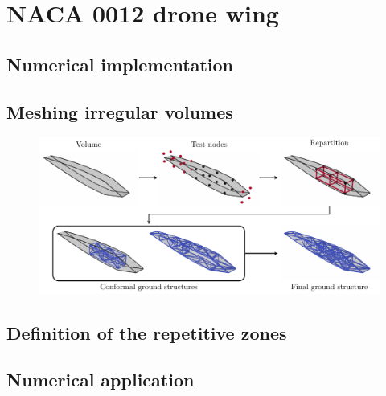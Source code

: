 \section{NACA 0012 drone wing}

\subsection{Numerical implementation}

\subsection{Meshing irregular volumes}
\begin{figure}
    \centering
    \includegraphics[width=\linewidth]{figures/07_aeronautic/00_naca_howtomesh/MESH.pdf}
     \caption{}
    \label{fig:07_howto}
\end{figure}

\subsection{Definition of the repetitive zones}

\subsection{Numerical application}

